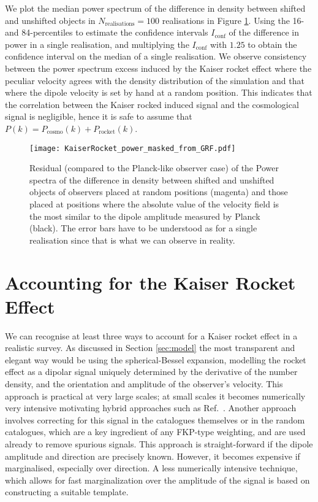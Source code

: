 \documentclass[a4paper,11pt]{article}
\begin{document}
We plot the median power spectrum of the difference in density between shifted and unshifted objects in $N_\mathrm{realisations} = 100$ realisations in Figure \ref{fig:KaiserRocket_power_FS_from_GRF}. Using the 16- and 84-percentiles to estimate the confidence intervals $I_\mathrm{conf}$ of the difference in power in a single realisation, and multiplying the $I_\mathrm{conf}$ with $1.25$ to obtain the confidence interval on the median of a single realisation. We  observe consistency between the power spectrum excess induced by the Kaiser rocket effect where the peculiar velocity agrees with the density distribution of the simulation and  that where the dipole velocity is set by hand at a random position.
This indicates that the correlation between the Kaiser rocked induced signal and the cosmological signal is negligible, hence it is safe to assume that $P(k)=P_\mathrm{cosmo}(k)+ P_\mathrm{rocket}(k)$.
\begin{figure}
    \centering
    \texttt{[image: KaiserRocket\_power\_masked\_from\_GRF.pdf]}
    \caption{Residual (compared to the Planck-like observer case) of the Power spectra of the difference in density between shifted and unshifted objects of observers placed at random positions (magenta) and those placed at positions where the absolute value of the velocity field is the most similar to the dipole amplitude measured by Planck (black). The error bars have to be understood as for a single realisation since that is what we can observe in reality.}
    \label{fig:KaiserRocket_power_FS_from_GRF}
\end{figure}

\section{Accounting for the Kaiser Rocket Effect}
 \label{sec:howtoaccountfor}
 We can recognise at least three ways to account for a Kaiser rocket effect in a realistic survey. As discussed in Section \ref{sec:model} the most transparent and elegant way would be using the spherical-Bessel expansion, modelling the rocket effect as a dipolar signal uniquely determined by the derivative of the number density,  and the orientation and amplitude of the observer's velocity.
 This approach is practical at very large scales; at small scales it becomes numerically very intensive motivating hybrid approaches such as Ref.~\cite{Mike:2018zvb}.
 Another approach involves correcting for this signal in the catalogues themselves or in the random catalogues, which are a key ingredient of any FKP-type  weighting, and are used already to remove spurious signals. This approach is straight-forward if the dipole amplitude and direction are precisely known. However, it becomes  expensive if marginalised, especially over direction. A  less numerically intensive technique, which allows for fast marginalization over the amplitude of the signal is based on constructing a suitable template. 
\end{document}
